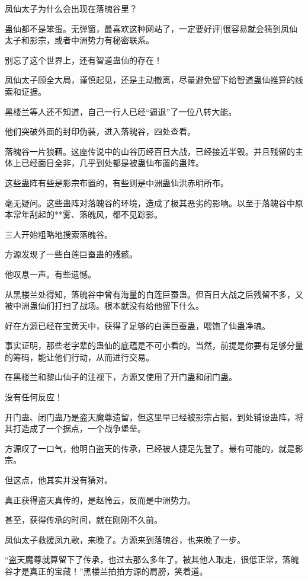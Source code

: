 \begin{this_body}
凤仙太子为什么会出现在落魄谷里？

蛊仙都不是笨蛋。无弹窗，最喜欢这种网站了，一定要好评]很容易就会猜到凤仙太子和影宗，或者中洲势力有秘密联系。

别忘了这个世界上，还有智道蛊仙的存在！

凤仙太子顾全大局，谨慎起见，还是主动撤离，尽量避免留下给智道蛊仙推算的线索和证据。

黑楼兰等人还不知道，自己一行人已经“逼退”了一位八转大能。

他们突破外面的封印伪装，进入落魄谷，四处查看。

落魄谷一片狼藉。这座传说中的山谷历经百日大战，已经接近半毁。并且残留的主体上已经面目全非，几乎到处都是被蛊仙布置的蛊阵。

这些蛊阵有些是影宗布置的，有些则是中洲蛊仙洪赤明所布。

毫无疑问。这些蛊阵对落魄谷的环境，造成了极其恶劣的影响。以至于落魄谷中原本常年刮起的**雾、落魄风，都不见踪影。

三人开始粗略地搜索落魄谷。

方源发现了一些白莲巨蚕蛊的残骸。

他叹息一声。有些遗憾。

从黑楼兰处得知，落魄谷中曾有海量的白莲巨蚕蛊。但百日大战之后残留不多，又被中洲蛊仙们打扫了战场。根本就没有给他留下什么。

好在方源已经在宝黄天中，获得了足够的白莲巨蚕蛊，喂饱了仙蛊净魂。

事实证明，那些老字辈的蛊仙的底蕴是不可小看的。当然，前提是你要有足够分量的筹码，能让他们行动，从而进行交易。

在黑楼兰和黎山仙子的注视下，方源又使用了开门蛊和闭门蛊。

没有任何反应！

开门蛊、闭门蛊乃是盗天魔尊遗留，但这里早已经被影宗占据，到处铺设蛊阵，将其打造成了一个据点，一个战争堡垒。

方源叹了一口气，他明白盗天的传承，已经被人捷足先登了。最有可能的，就是影宗。

但这点，他其实并没有猜对。

真正获得盗天真传的，是赵怜云，反而是中洲势力。

甚至，获得传承的时间，就在刚刚不久前。

凤仙太子救援凤九歌，来晚了。方源来到落魄谷，也来晚了一步。

“盗天魔尊就算留下了传承，也过去那么多年了。被其他人取走，很低正常，落魄谷才是真正的宝藏！”黑楼兰拍拍方源的肩膀，笑着道。


\end{this_body}
